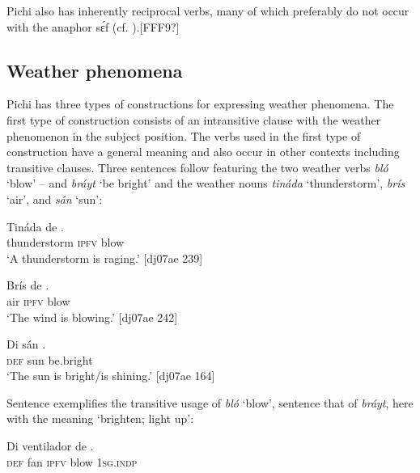 Pichi also has inherently reciprocal verbs, many of which preferably do not occur with the anaphor sɛ́f (cf. ).[FFF9?] 

\subsection{Weather phenomena}\label{sec:9.3.7}

Pichi has three types of constructions for expressing weather phenomena. The first type of construction consists of an intransitive clause with the weather phenomenon in the subject position. The verbs used in the first type of construction have a general meaning and also occur in other contexts including transitive clauses. Three sentences follow featuring the two weather verbs \textit{bló} ‘blow’ – and \textit{bráyt} ‘be bright’  and the weather nouns \textit{tináda} ‘thunderstorm’, \textit{brís} ‘air’, and \textit{sán} ‘sun’: 


\ea%
    \label{ex:key:1237}
    \gll Tináda      de  .\\
thunderstorm  \textsc{ipfv}  blow\\

\glt ‘A thunderstorm is raging.’ [dj07ae 239]
\z


\ea%
    \label{ex:key:1238}
    \gll Brís  de  .\\
air  \textsc{ipfv}  blow\\

\glt ‘The wind is blowing.’ [dj07ae 242]
\z


\ea%
    \label{ex:key:1239}
    \gll Di  sán  .\\
\textsc{def}  sun  be.bright\\

\glt ‘The sun is bright/is shining.’ [dj07ae 164]
\z

Sentence  exemplifies the transitive usage of \textit{bló} ‘blow’, sentence  that of \textit{bráyt}, here with the meaning ‘brighten; light up’:


\ea%
    \label{ex:key:1240}
    \gll Di  ventilador  de      .\\
\textsc{def}  fan      \textsc{ipfv}  blow  \textsc{1sg.indp}\\

